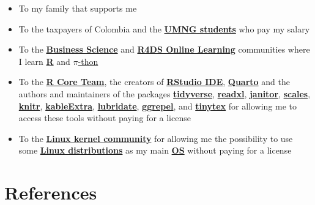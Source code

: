 \documentclass[
  ignorenonframetext,
]{beamer}
\begin{document}
\begin{frame}{}
\label{section-18}
\begin{itemize}
\item
  To my family that supports me
\item
  To the taxpayers of Colombia and the
  \href{https://www.umng.edu.co/estudiante}{\textbf{UMNG students}} who
  pay my salary
\item
  To the \href{https://www.business-science.io/}{\textbf{Business
  Science}} and \href{https://www.rfordatasci.com/}{\textbf{R4DS Online
  Learning}} communities where I learn
  \href{https://www.r-project.org/about.html}{\textbf{R}} and
  \href{https://www.python.org/about/}{\(\pi\)-thon}
\item
  To the \href{https://www.r-project.org/contributors.html}{\textbf{R
  Core Team}}, the creators of
  \href{https://rstudio.com/products/rstudio/}{\textbf{RStudio IDE}},
  \href{https://quarto.org/}{\textbf{Quarto}} and the authors and
  maintainers of the packages
  \href{https://CRAN.R-project.org/package=tidyverse}{\textbf{tidyverse}},
  \href{https://CRAN.R-project.org/package=readxl}{\textbf{readxl}},
  \href{https://CRAN.R-project.org/package=janitor}{\textbf{janitor}},
  \href{https://CRAN.R-project.org/package=scales}{\textbf{scales}},
  \href{https://CRAN.R-project.org/package=knitr}{\textbf{knitr}},
  \href{https://CRAN.R-project.org/package=kableExtra}{\textbf{kableExtra}},
  \href{https://CRAN.R-project.org/package=lubridate}{\textbf{lubridate}},
  \href{https://CRAN.R-project.org/package=ggrepel}{\textbf{ggrepel}},
  and
  \href{https://CRAN.R-project.org/package=tinytex}{\textbf{tinytex}}
  for allowing me to access these tools without paying for a license
\item
  To the \href{https://www.kernel.org/category/about.html}{\textbf{Linux
  kernel community}} for allowing me the possibility to use some
  \href{https://static.lwn.net/Distributions/}{\textbf{Linux
  distributions}} as my main
  \href{https://en.wikipedia.org/wiki/Operating_system}{\textbf{OS}}
  without paying for a license
\end{itemize}
\end{frame}

\section*{References}\label{references}
\end{document}
